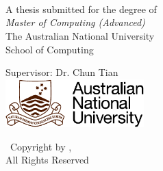 \begin{titlepage}
  \begin{center}
    \vspace*{0cm}
    { \fontsize{20}{10} \selectfont \thesistitle} \\
    \vspace{0.3cm}
    { \fontsize{20}{10} \selectfont \thesistitletwo} \\
            \vspace{0.3cm}
    { \fontsize{20}{10} \selectfont \thesistitlethree}

    \vspace{1.75cm}
    {\bf \huge \fullname}\\
    \vspace{1.75cm}
    {\large A thesis submitted for the degree of}\\
    \vspace{0.5cm}
    {\it \large Master of Computing (Advanced)}\\
    \vspace{0.5cm}
    {\large The Australian National University}\\
    \vspace{0.5cm}
    { \large School of Computing} \par
    \vspace{0.5cm}
    {\large Supervisor: Dr. Chun Tian}\\
    \vspace{2.0cm}
    \includegraphics[width=0.4\textwidth]{anu-logo-colour.pdf}\\
    \vspace{2.0cm}
    {\large \thesisdate}

    \vspace{1.5cm}
    {\large  \textcopyright\ Copyright by \fullname,  \thesisyear \\}
    \vspace{0.5cm}
    {\large All Rights Reserved}
  \end{center}
\end{titlepage}
